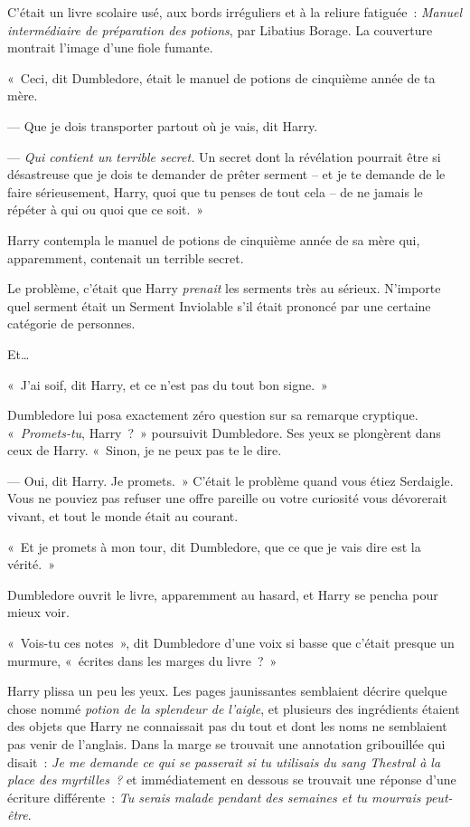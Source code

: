C'était un livre scolaire usé, aux bords irréguliers et à la reliure fatiguée~: \emph{Manuel intermédiaire de préparation des potions}, par Libatius Borage.
La couverture montrait l'image d'une fiole fumante.

«~Ceci, dit Dumbledore, était le manuel de potions de cinquième année de ta mère.

--- Que je dois transporter partout où je vais, dit Harry.

--- \emph{Qui contient un terrible secret.}
Un secret dont la révélation pourrait être si désastreuse que je dois te demander de prêter serment -- et je te demande de le faire sérieusement, Harry, quoi que tu penses de tout cela -- de ne jamais le répéter à qui ou quoi que ce soit.~»

Harry contempla le manuel de potions de cinquième année de sa mère qui, apparemment, contenait un terrible secret.

Le problème, c'était que Harry \emph{prenait} les serments très au sérieux.
N'importe quel serment était un Serment Inviolable s'il était prononcé par une certaine catégorie de personnes.

Et…

«~J'ai soif, dit Harry, et ce n'est pas du tout bon signe.~»

Dumbledore lui posa exactement zéro question sur sa remarque cryptique.
«~\emph{Promets-tu}, Harry~?~» poursuivit Dumbledore.
Ses yeux se plongèrent dans ceux de Harry.
«~Sinon, je ne peux pas te le dire.

--- Oui, dit Harry. Je promets.~»
C'était le problème quand vous étiez Serdaigle.
Vous ne pouviez pas refuser une offre pareille ou votre curiosité vous dévorerait vivant, et tout le monde était au courant.

«~Et je promets à mon tour, dit Dumbledore, que ce que je vais dire est la vérité.~»

Dumbledore ouvrit le livre, apparemment au hasard, et Harry se pencha pour mieux voir.

«~Vois-tu ces notes~», dit Dumbledore d'une voix si basse que c'était presque un murmure, «~écrites dans les marges du livre~?~»

Harry plissa un peu les yeux.
Les pages jaunissantes semblaient décrire quelque chose nommé \emph{potion de la splendeur de l'aigle}, et plusieurs des ingrédients étaient des objets que Harry ne connaissait pas du tout et dont les noms ne semblaient pas venir de l'anglais.
Dans la marge se trouvait une annotation gribouillée qui disait~: \emph{Je me demande ce qui se passerait si tu utilisais du sang Thestral à la place des myrtilles~?} et immédiatement en dessous se trouvait une réponse d'une écriture différente~: \emph{Tu serais malade pendant des semaines et tu mourrais peut-être}.

